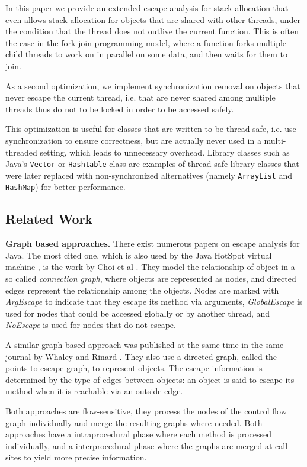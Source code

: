 \documentclass[letterpaper]{article}
\newcommand{\mypar}[1]{{\bf #1.}}
\begin{document}
In this paper we provide an extended escape analysis for stack allocation that
even allows stack allocation for objects that are shared with other threads,
under the condition that the thread does not outlive the current function.
This is often the case in the fork-join programming model, where a function
forks multiple child threads to work on in parallel on some data, and then
waits for them to join.

As a second optimization, we implement synchronization removal on objects that
never escape the current thread, i.e. that are never shared among multiple threads
thus do not to be locked in order to be accessed safely. 

This optimization is useful for classes that are written to be thread-safe,
i.e. use synchronization to ensure correctness, but are actually never used
in a multi-threaded setting, which leads to unnecessary overhead. Library
classes such as Java's \texttt{Vector} or \texttt{Hashtable} class are examples
of thread-safe library classes that were later replaced with non-synchronized
alternatives (namely \texttt{ArrayList} and \texttt{HashMap}) for better
performance.

\subsection{Related Work}

\mypar{Graph based approaches}
There exist numerous papers on escape analysis for Java. The most cited one,
which is also used by the Java HotSpot virtual machine \cite{HotSpot}, is the work by
Choi et al \cite{Choi:99}. They model the relationship of object in a so called
\emph{connection graph}, where objects are represented as nodes, and directed
edges represent the relationship among the objects. Nodes are marked with \emph{ArgEscape}
to indicate that they escape its method via arguments, \emph{GlobalEscape} is used
for nodes that could be accessed globally or by another thread, and \emph{NoEscape}
is used for nodes that do not escape.

A similar graph-based approach was published at the same time in the same journal
by Whaley and Rinard \cite{Whaley:99}. They also use a directed graph, called the points-to-escape graph,
to represent objects. The escape information is determined by the type of edges
between objects: an object is said to escape its method when it is reachable via an outside edge.

Both approaches are flow-sensitive, they process the nodes of the control flow graph
individually and merge the resulting graphs where needed. Both approaches have a
intraprocedural phase where each method is processed individually, and a interprocedural
phase where the graphs are merged at call sites to yield more precise information.
\end{document}
